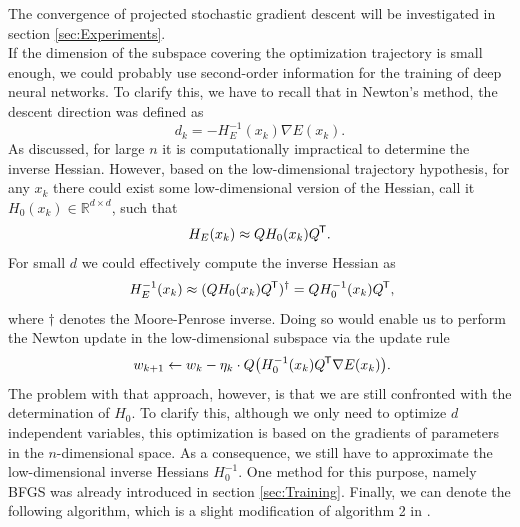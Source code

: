 \documentclass[11pt, a4paper]{article}
\newcommand{\R}{\mathbb{R}}
\newcommand*{\tr}{^{\mkern-1.5mu\mathsf{T}}}
\begin{document}
The convergence of projected stochastic gradient descent will be investigated in section \ref{sec:Experiments}. \\

If the dimension of the subspace covering the optimization trajectory is small enough, we could probably use second-order information for the training of deep neural networks. To clarify this, we have to recall that in Newton's method, the descent direction was defined as
\[ d_k = - H_E^{-1}(x_k) \nabla E(x_k). \]
As discussed, for large $n$ it is computationally impractical to determine the inverse Hessian. However, based on the low-dimensional trajectory hypothesis, for any $x_k$ there could exist some low-dimensional version of the Hessian, call it $H_0(x_k) \in \R^{d \times d}$, such that
\[ H_E(x_k) \approx Q H_0(x_k) Q \tr. \]
For small $d$ we could effectively compute the inverse Hessian as
\[ H_E^{-1}(x_k) \approx ( Q H_0(x_k) Q \tr )^\dagger = Q H_0^{-1}(x_k) Q \tr, \]
where $\dagger$ denotes the Moore-Penrose inverse. Doing so would enable us to perform the Newton update in the low-dimensional subspace via the update rule
\[ w_{k+1} \leftarrow w_k - \eta_k \cdot Q \big (H_0^{-1}(x_k) Q \tr \nabla E(x_k) \big ). \]
The problem with that approach, however, is that we are still confronted with the determination of $H_0$. To clarify this, although we only need to optimize $d$ independent variables, this optimization is based on the gradients of parameters in the $n$-dimensional space. As a consequence, we still have to approximate the low-dimensional inverse Hessians $H_0^{-1}$. One method for this purpose, namely BFGS was already introduced in section \ref{sec:Training}. Finally, we can denote the following algorithm, which is a slight modification of algorithm 2 in \cite{Paper}.
\end{document}
